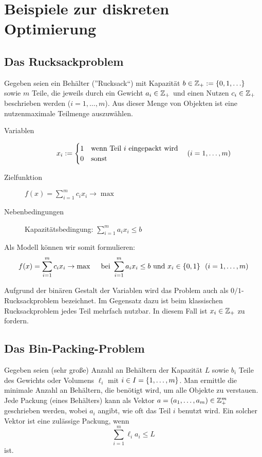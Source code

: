 \section{Beispiele zur diskreten Optimierung}

\subsection{Das Rucksackproblem}

Gegeben seien ein Behälter (''Rucksack``) mit Kapazität $b \in \Z_+ \defeq \menge{0, 1, \dots}$ sowie $m$ Teile, die jeweils durch ein Gewicht $a_i \in \mathbb{Z}_+$ und einen Nutzen $c_i \in \mathbb{Z}_+$ beschrieben werden ($i = 1, \dots , m$). Aus dieser Menge von Objekten ist eine nutzenmaximale Teilmenge auszuwählen.


\begin{description}
	\item[Variablen] \begin{equation*}
		x_i \mathrel{:=} \begin{cases}
		1 & \text{wenn Teil $i$ eingepackt wird} \\ 0 & \text{sonst}
		\end{cases} \quad (i = 1, \dots , m)
	\end{equation*}
	\item[Zielfunktion] $f(x) = \sum\limits_{i=1}^{m} c_i x_i \to \max$
	\item[Nebenbedingungen] Kapazitätsbedingung: $\sum\limits_{i=1}^{m} a_i x_i \le b$
\end{description}

Als Modell können wir somit formulieren:
\begin{equation*}
	\begin{aligned}
	f(x) = \sum_{i=1}^{m} c_i x_i \to \max \quad \text{ bei } \sum_{i=1}^m a_i x_i \le b \text{ und } x_i \in \left\{ 0,1 \right\} \enskip (i = 1, \dots , m)
	\end{aligned}
\end{equation*}

Aufgrund der binären Gestalt der Variablen wird das Problem auch als $0/1$-Rucksackproblem bezeichnet. Im Gegensatz dazu ist beim klassischen Rucksackproblem jedes Teil mehrfach nutzbar. In diesem Fall ist $x_i \in \mathbb{Z}_+$ zu fordern.

\subsection{Das Bin-Packing-Problem}

Gegeben seien (sehr große) Anzahl an Behältern der Kapazität $L$ sowie $b_i$ Teile des Gewichts oder Volumens $\ell_i$ mit $i \in I = \left\{ 1, \dots , m \right\}$. Man ermittle die minimale Anzahl an Behältern, die benötigt wird, um alle Objekte zu verstauen.
Jede Packung (eines Behälters) kann als Vektor $a = (a_1 , \dots , a_m) \in \mathbb{Z}_+^m$ geschrieben werden, wobei $a_i$ angibt, wie oft das Teil $i$ benutzt wird. Ein solcher Vektor ist eine zulässige Packung, wenn 
\begin{equation*}
	\sum_{i=1}^m \ell_i a_i \le L
\end{equation*} 
ist.

